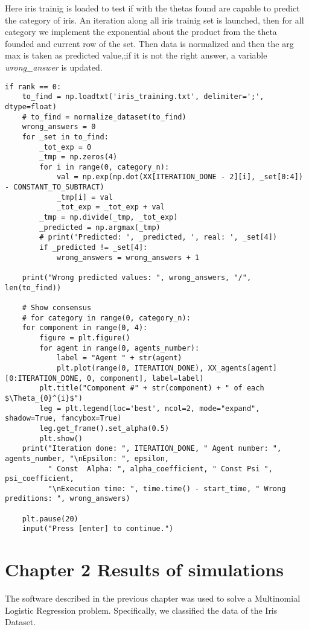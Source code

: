 \documentclass[a4paper,11pt,oneside]{book}
\begin{document}
Here iris trainig is loaded to test if with the thetas found are capable to predict the category of iris. An iteration along all iris trainig set
is launched, then for all category we implement the exponential about the product from the theta founded and current row of the set. Then data is normalized and then the arg max is taken as predicted value,;if it is not the right answer, a variable \textit{wrong\_answer} is updated.

\begin{lstlisting}
if rank == 0:
    to_find = np.loadtxt('iris_training.txt', delimiter=';', dtype=float)
    # to_find = normalize_dataset(to_find)
    wrong_answers = 0
    for _set in to_find:
        _tot_exp = 0
        _tmp = np.zeros(4)
        for i in range(0, category_n):
            val = np.exp(np.dot(XX[ITERATION_DONE - 2][i], _set[0:4]) - CONSTANT_TO_SUBTRACT)
            _tmp[i] = val
            _tot_exp = _tot_exp + val
        _tmp = np.divide(_tmp, _tot_exp)
        _predicted = np.argmax(_tmp)
        # print('Predicted: ', _predicted, ', real: ', _set[4])
        if _predicted != _set[4]:
            wrong_answers = wrong_answers + 1

    print("Wrong predicted values: ", wrong_answers, "/", len(to_find))

    # Show consensus
    # for category in range(0, category_n):
    for component in range(0, 4):
        figure = plt.figure()
        for agent in range(0, agents_number):
            label = "Agent " + str(agent)
            plt.plot(range(0, ITERATION_DONE), XX_agents[agent][0:ITERATION_DONE, 0, component], label=label)
        plt.title("Component #" + str(component) + " of each $\Theta_{0}^{i}$")
        leg = plt.legend(loc='best', ncol=2, mode="expand", shadow=True, fancybox=True)
        leg.get_frame().set_alpha(0.5)
        plt.show()
    print("Iteration done: ", ITERATION_DONE, " Agent number: ", agents_number, "\nEpsilon: ", epsilon,
          " Const  Alpha: ", alpha_coefficient, " Const Psi ", psi_coefficient,
          "\nExecution time: ", time.time() - start_time, " Wrong preditions: ", wrong_answers)

    plt.pause(20)
    input("Press [enter] to continue.")
\end{lstlisting}




\chapter{Chapter 2 Results of simulations} \label{Cap2}
The software described in the previous chapter was used to solve a Multinomial Logistic Regression problem. Specifically, we classified the data of the Iris Dataset.
\end{document}

